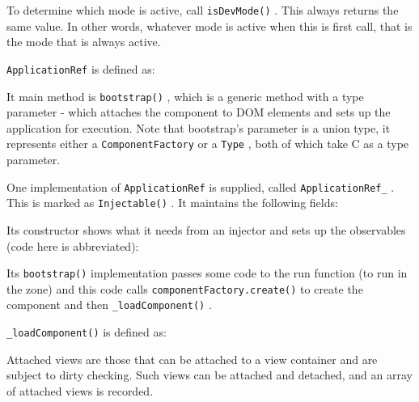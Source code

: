 

To determine which mode is active, call
\texttt{isDevMode()}
. This always returns the same
value. In other words, whatever mode is active when this is first call, that is the mode
that is always active.



\texttt{ApplicationRef}
is defined as:



It main method is
\texttt{bootstrap()}
, which is a generic method with a type parameter -
which attaches the component to DOM elements and sets up the application for
execution. Note that bootstrap’s parameter is a union type, it represents either a
\texttt{ComponentFactory}
or a
\texttt{Type}
, both of which take C as a type parameter.

One implementation of
\texttt{ApplicationRef}
is supplied, called
\texttt{ApplicationRef\_}
. This is
marked as
\texttt{Injectable()}
. It maintains the following fields:



Its constructor shows what it needs from an injector and sets up the observables
(code here is abbreviated):



Its
\texttt{bootstrap()}
implementation passes some code to the run function (to run in the
zone) and this code calls
\texttt{componentFactory.create()}
to create the component and
then
\texttt{\_loadComponent()}
.



\texttt{\_loadComponent()}
is defined as:



Attached views are those that can be attached to a view container and are subject to
dirty checking. Such views can be attached and detached, and an array of attached
views is recorded.


